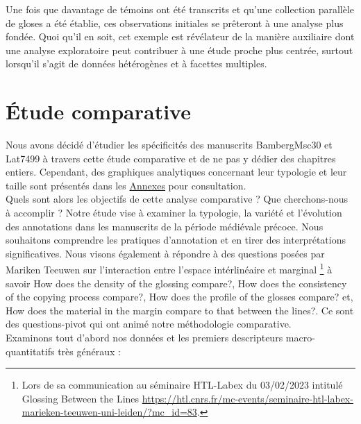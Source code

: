 \documentclass[a4paper, twoside, 12pt]{book}
\begin{document}
{Une fois que davantage de témoins ont été transcrits et qu'une collection parallèle de gloses a été établie, ces observations initiales se prêteront à une analyse plus fondée. Quoi qu'il en soit, cet exemple est révélateur de la manière auxiliaire dont une analyse exploratoire peut contribuer à une étude proche plus centrée, surtout lorsqu'il s'agit de données hétérogènes et à facettes multiples.\\



\section{Étude comparative}


Nous avons décidé d'étudier les spécificités des manuscrits BambergMsc30 et Lat7499 à travers cette étude comparative et de ne pas y dédier des chapitres entiers. Cependant, des graphiques analytiques concernant leur typologie et leur taille sont présentés dans les \hyperref[annexes]{Annexes} pour consultation.\\ 


Quels sont alors les objectifs de cette analyse comparative ? Que cherchons-nous à accomplir ? Notre étude vise à examiner la typologie, la variété et l'évolution des annotations dans les manuscrits de la période médiévale précoce. Nous souhaitons comprendre les pratiques d'annotation et en tirer des interprétations significatives. Nous visons également à répondre à des questions posées par Mariken Teeuwen sur l'interaction entre l'espace intérlinéaire et marginal \footnote{Lors de sa communication au séminaire HTL-Labex du 03/02/2023 intitulé \og{}Glossing Between the Lines
\fg{}\url{https://htl.cnrs.fr/mc-events/seminaire-htl-labex-marieken-teeuwen-uni-leiden/?mc_id=83}.} à savoir \og{}How does the density of the glossing compare?\fg{}, \og{}How does the consistency of the copying process compare?\fg{}, \og{}How does the profile of the glosses compare?\fg{} et, \og{}How does the material in the margin
compare to that between the lines?\fg{}. Ce sont des questions-pivot qui ont animé notre méthodologie comparative. \\

Examinons tout d'abord nos données et les premiers descripteurs macro-quantitatifs très généraux :\\

}
\end{document}
